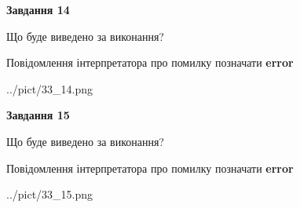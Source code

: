 \documentclass[11pt, ukrainian]{article}
\begin{document}
{\begin {large}
{\begin {center}\textbf{Завдання 14}\end {center}}\par
Що буде виведено за виконання? \par
Повідомлення інтерпретатора про помилку позначати \textbf{error}

\begin{center}
	{../pict/33_14.png}
\end{center}
\newpage

{\begin {center}\textbf{Завдання 15}\end {center}}\par
Що буде виведено за виконання? \par
Повідомлення інтерпретатора про помилку позначати \textbf{error}

\begin{center}
	{../pict/33_15.png}
\end{center}
\newpage

\end {large}}
\end{document}
